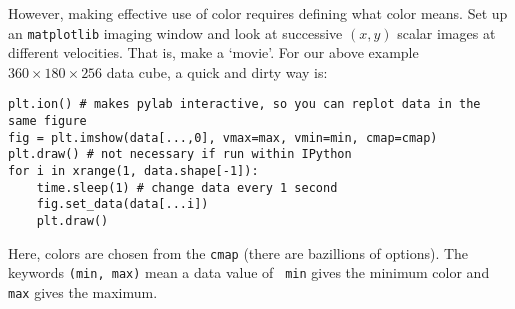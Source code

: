 \documentclass[psfig,preprint]{aastex}
\begin{document}
However, making effective use of color requires defining what color
means.  Set up
an {\tt matplotlib} imaging window and look at successive $(x,y)$ scalar images at
different velocities. That is, make a `movie'. For our above example
$360 \times 180 \times 256$ data cube, a quick and dirty way
is: 

\begin{verbatim}
plt.ion() # makes pylab interactive, so you can replot data in the same figure
fig = plt.imshow(data[...,0], vmax=max, vmin=min, cmap=cmap)
plt.draw() # not necessary if run within IPython
for i in xrange(1, data.shape[-1]):
    time.sleep(1) # change data every 1 second
    fig.set_data(data[...i])
    plt.draw()
\end{verbatim}

Here, colors are chosen from the {\tt cmap} (there are bazillions of options).
The keywords {\tt (min, max)} mean a data value of {\tt
  min} gives the minimum color and {\tt max} gives the maximum.
\end{document}
